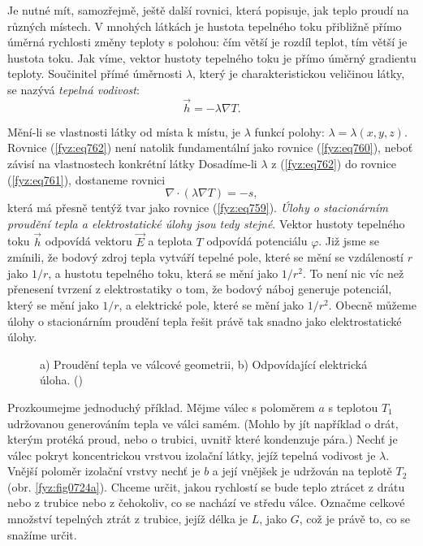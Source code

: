     Je nutné mít, samozřejmě, ještě další rovnici, která popisuje, jak teplo proudí na různých
    místech. V mnohých látkách je hustota tepelného toku přibližně přímo úměrná rychlosti změny
    teploty s polohou: čím větší je rozdíl teplot, tím větší je hustota toku. Jak víme, vektor
    hustoty tepelného toku je přímo úměrný gradientu teploty. Součinitel přímé úměrnosti
    \(\lambda\), který je charakteristickou veličinou látky, se nazývá \emph{tepelná vodivost}:
    \begin{equation}\label{fyz:eq762}
      \vec{h} = -\lambda\nabla T.
    \end{equation}

    Mění-li se vlastnosti látky od místa k místu, je \(\lambda\) funkcí polohy: \(\lambda =
    \lambda(x,y,z)\). Rovnice (\ref{fyz:eq762}) není natolik fundamentální jako rovnice
    (\ref{fyz:eq760}), neboť závisí na vlastnostech konkrétní látky Dosadíme-li \(\lambda\) z
    (\ref{fyz:eq762}) do rovnice (\ref{fyz:eq761}), dostaneme rovnici
    \begin{equation}\label{fyz:eq763}
      \nabla\cdot(\lambda\nabla T)= - s,
    \end{equation}
    která má přesně tentýž tvar jako rovnice (\ref{fyz:eq759}). \emph{Úlohy o stacionárním proudění
    tepla a elektrostatické úlohy jsou tedy stejné}. Vektor hustoty tepelného toku \(\vec{h}\)
    odpovídá vektoru \(\vec{E}\) a teplota \(T\) odpovídá potenciálu \(\varphi\). Již jsme se
    zmínili, že bodový zdroj tepla vytváří tepelné pole, které se mění se vzdáleností \(r\) jako
    \(1/r\), a hustotu tepelného toku, která se mění jako \(1/r^2\). To není nic víc než přenesení
    tvrzení z elektrostatiky o tom, že bodový náboj generuje potenciál, který se mění jako \(1/r\),
    a elektrické pole, které se mění jako \(1/r^2\). Obecně můžeme úlohy o stacionárním proudění
    tepla řešit právě tak snadno jako elektrostatické úlohy.

    \begin{figure}[ht!]  %
      \centering
      \caption{a) Proudění tepla ve válcové geometrii, b) Odpovídající elektrická úloha. 
        (\cite[s.~206]{Feynman02})}
      \label{fyz:fig0724}
    \end{figure}

    Prozkoumejme jednoduchý příklad. Mějme válec s poloměrem \(a\) s teplotou \(T_1\) udržovanou
    generováním tepla ve válci samém. (Mohlo by jít například o drát, kterým protéká proud, nebo o
    trubici, uvnitř které kondenzuje pára.) Nechť je válec pokryt koncentrickou vrstvou izolační
    látky, jejíž tepelná vodivost je \(\lambda\). Vnější poloměr izolační vrstvy nechť je \(b\) a
    její vnějšek je udržován na teplotě \(T_2\) (obr. \ref{fyz:fig0724a}). Chceme určit, jakou
    rychlostí se bude teplo ztrácet z drátu nebo z trubice nebo z čehokoliv, co se nachází ve středu
    válce. Označme celkové množství tepelných ztrát z trubice, jejíž délka je \(L\), jako \(G\),
    což je právě to, co se snažíme určit.

